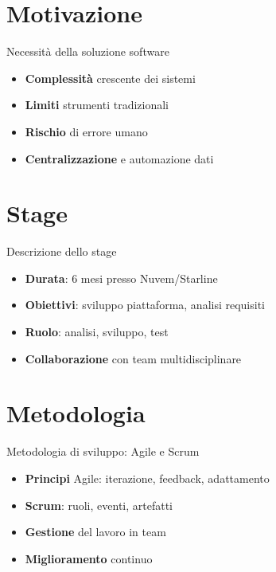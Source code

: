 \documentclass{beamer}
\begin{document}
\section{Motivazione}
\begin{frame}{Necessità della soluzione software}
    \begin{itemize}
        \item \textbf{Complessità} crescente dei sistemi
        \item \textbf{Limiti} strumenti tradizionali
        \item \textbf{Rischio} di errore umano
        \item \textbf{Centralizzazione} e automazione dati
    \end{itemize}
\end{frame}

\section{Stage}
\begin{frame}{Descrizione dello stage}
    \begin{itemize}
        \item \textbf{Durata}: 6 mesi presso Nuvem/Starline
        \item \textbf{Obiettivi}: sviluppo piattaforma, analisi requisiti
        \item \textbf{Ruolo}: analisi, sviluppo, test
        \item \textbf{Collaborazione} con team multidisciplinare
    \end{itemize}
\end{frame}

\section{Metodologia}
\begin{frame}{Metodologia di sviluppo: Agile e Scrum}
    \begin{itemize}
        \item \textbf{Principi} Agile: iterazione, feedback, adattamento
        \item \textbf{Scrum}: ruoli, eventi, artefatti
        \item \textbf{Gestione} del lavoro in team
        \item \textbf{Miglioramento} continuo
    \end{itemize}
\end{frame}
\end{document}
